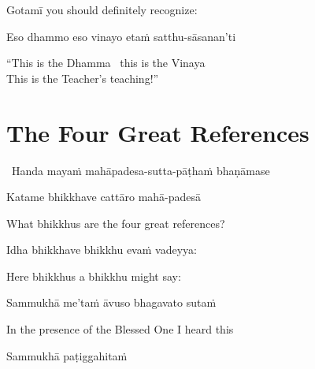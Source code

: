 \begin{english}
  Gotamī\makeatletter\hyperlink{endnote85-appendix}\makeatother \thinspace
  you should definitely recognize:
\end{english}

Eso dhammo eso vinayo etaṁ satthu-sāsanan'ti

\begin{english}
  ``This is the Dhamma \breathmark\ this is the Vinaya\\
  This is the Teacher's teaching!''
\end{english}

\suttaRef{[AN 8.53]}


\section{The Four Great References}
\label{four-great-references}

\begin{leader}
  \anglebracketleft\ \hspace{-0.5mm}Handa mayaṁ mahāpadesa-sutta-pāṭhaṁ bhaṇāmase \hspace{-0.5mm}\anglebracketright\
\end{leader}

Katame bhikkhave cattāro mahā-padesā

\begin{english}
  What bhikkhus are the four great references?
\end{english}

Idha bhikkhave bhikkhu evaṁ vadeyya:

\begin{english}
  Here bhikkhus a bhikkhu might say:
\end{english}

Sammukhā me'taṁ āvuso bhagavato sutaṁ

\begin{english}
  In the presence of the Blessed One I heard this
\end{english}

Sammukhā paṭiggahitaṁ

